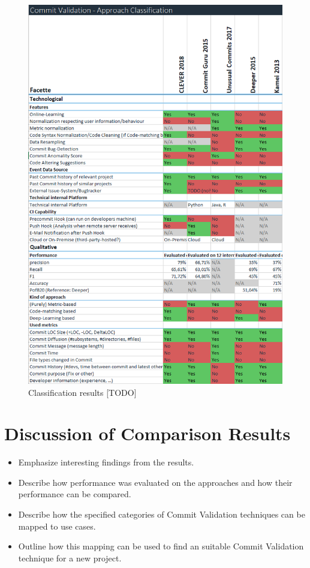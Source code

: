 \begin{figure}[H]
	\centering
	\includegraphics[width=15cm]{images/classification}
	\caption{Classification results [TODO]}
	\label{fig:classification}
\end{figure}

\section{Discussion of Comparison Results}
\label{sec:discussion}
\begin{itemize}
	\item Emphasize interesting findings from the results.
	\item Describe how performance was evaluated on the approaches and how their performance can be compared.
	\item Describe how the specified categories of Commit Validation techniques can be mapped to use cases.
	\item Outline how this mapping can be used to find an suitable Commit Validation technique for a new project.
\end{itemize}


